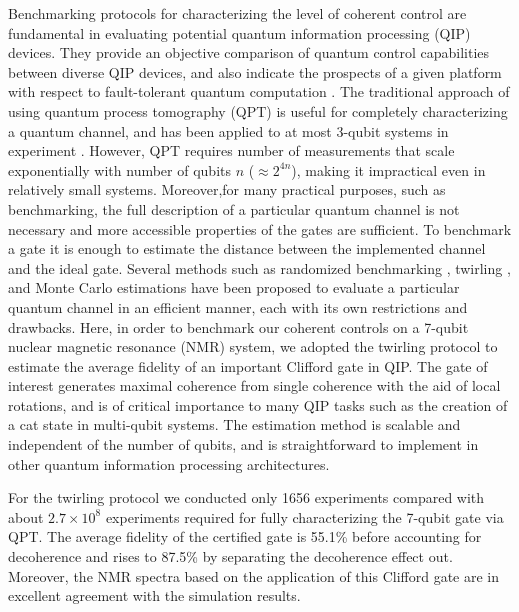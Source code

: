 \documentclass[prl,twocolumn,showpacs,superscriptaddress]{revtex4-1}
\begin{document}
Benchmarking protocols for characterizing the level of coherent control are  fundamental  in evaluating potential quantum information processing (QIP) devices. They  provide an objective  comparison of quantum control capabilities between diverse QIP devices, and also indicate the prospects of a  given platform  with respect to  fault-tolerant quantum computation \cite{Preskill1998}. The traditional approach of  using  quantum process tomography (QPT) \cite{Chuang1997,Poyatos1997} is useful for completely characterizing  a quantum channel, and has been applied to at most 3-qubit systems in experiment \cite{Childs2001,Weinstein2004,Brien2004,Riebe2006,Chow2009,Bialczak2010,Kim2014,Feng2013}. However, QPT  requires number of measurements that scale exponentially with  number of qubits $n$ ($\approx2^{4n}$), making it impractical  even in relatively small systems. Moreover,for many practical purposes, such as benchmarking, the full description of a particular quantum channel  is not necessary and more accessible properties  of the gates are sufficient. To benchmark a gate it is enough to estimate the distance between the implemented channel and the ideal gate.   Several methods such as randomized benchmarking \cite{Emerson2005,Knill2008,Ryan2009}, twirling \cite{Emerson2007,Dankert2009,Moussa2012}, and Monte Carlo estimations \cite{Flammia2011,Silva2011} have been proposed to evaluate a particular quantum channel in an efficient manner, each with its  own restrictions and drawbacks. Here, in order to benchmark our coherent controls on a 7-qubit nuclear magnetic resonance (NMR) system, we adopted the twirling protocol \cite{Moussa2012} to estimate the average fidelity of an important Clifford gate in QIP. The gate of  interest  generates   maximal coherence from single coherence with the aid of  local rotations, and is  of critical importance to many QIP tasks such as the creation of a cat state in multi-qubit systems. The estimation method is scalable and independent of the number of qubits, and is straightforward to implement in other quantum information processing architectures.

For the twirling protocol we conducted only 1656 experiments compared with about $2.7\times 10^8$ experiments required for fully characterizing the 7-qubit gate via QPT.  The average fidelity of the certified gate is 55.1\% before accounting for decoherence and rises to 87.5\% by separating the decoherence effect out. Moreover, the NMR spectra based on the application of this Clifford gate are in excellent agreement with the simulation results.
\end{document}
